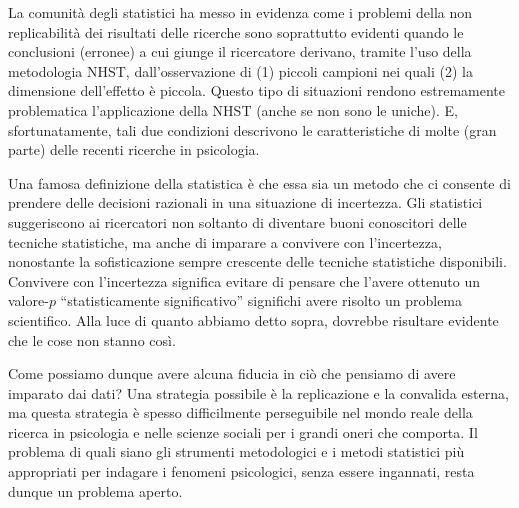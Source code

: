 La comunità degli statistici ha messo in evidenza come i problemi della non replicabilità dei risultati delle ricerche sono soprattutto evidenti quando le conclusioni (erronee) a cui giunge il ricercatore derivano, tramite l'uso della metodologia NHST, dall'osservazione di (1) piccoli campioni nei quali (2) la dimensione dell'effetto è piccola. 
Questo tipo di situazioni rendono estremamente problematica l'applicazione della NHST (anche se non sono le uniche). 
E, sfortunatamente, tali due condizioni descrivono le caratteristiche di molte (gran parte) delle recenti ricerche in psicologia. 

Una famosa definizione della statistica è che essa sia un metodo che ci consente di prendere delle decisioni razionali in una situazione di incertezza. 
Gli statistici suggeriscono ai ricercatori non soltanto di diventare buoni conoscitori delle tecniche statistiche, ma anche di imparare a convivere con l'incertezza, nonostante la sofisticazione sempre crescente delle tecniche statistiche disponibili.
Convivere con l'incertezza significa evitare di pensare che l'avere ottenuto un valore-$p$ ``statisticamente significativo'' significhi avere risolto un problema scientifico.
Alla luce di quanto abbiamo detto sopra, dovrebbe risultare evidente che le cose non stanno così.

Come possiamo dunque avere alcuna fiducia in ciò che pensiamo di avere imparato dai dati? 
Una strategia possibile è la replicazione e la convalida esterna, ma questa strategia è spesso difficilmente perseguibile nel mondo reale della ricerca in psicologia e nelle scienze sociali per i grandi oneri che comporta. 
Il problema di quali siano gli strumenti metodologici e i metodi statistici più appropriati per indagare i fenomeni psicologici, senza essere ingannati, resta dunque un problema aperto.




